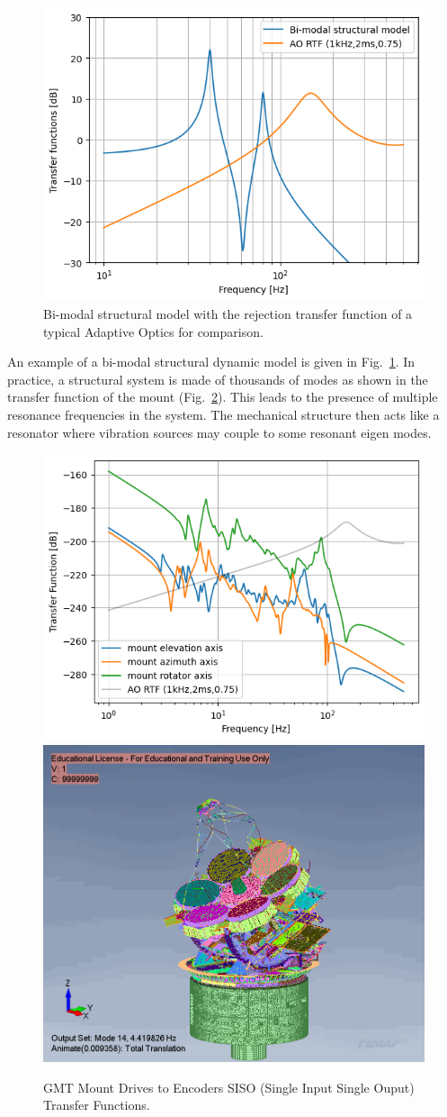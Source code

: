 \documentclass[]{AO4ELT}  %
\begin{document}
\begin{figure}
   \centering
   \includegraphics[width=0.5\linewidth]{bi-modal_sm.png}
   \caption{Bi-modal structural model with the rejection transfer function of a typical Adaptive Optics for comparison.}
   \label{fig:90}
\end{figure}

An example of a bi-modal structural dynamic model is given in Fig.~\ref{fig:90}.
In practice, a structural system is made of thousands of modes as shown in the transfer function of the mount (Fig.~\ref{fig:9}).
This leads to the presence of multiple resonance frequencies in the system.
The mechanical structure then acts like a resonator where vibration sources may couple to some resonant eigen modes.


\begin{figure}
   \centering
   \includegraphics[width=0.495\linewidth]{mount-axis-tfs.png}
   \includegraphics[width=0.4\linewidth]{fem-mode-9.png}
   \caption{GMT Mount Drives to Encoders SISO (Single Input Single Ouput) Transfer Functions.}
   \label{fig:9}
\end{figure}
\end{document}
